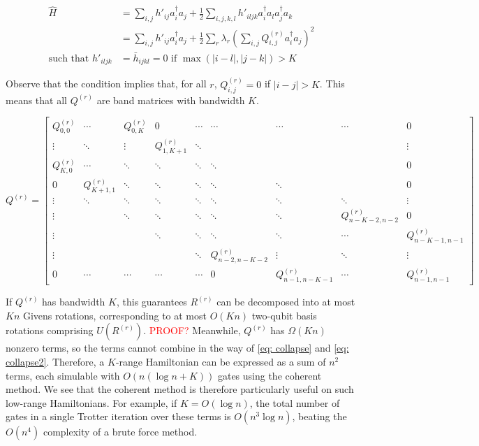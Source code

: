 \begin{equation}
    \begin{split}
        \hat{H} &= \sum_{i, j} h'_{ij}a^\dag_ia_j + \frac{1}{2}\sum_{i,j,k,l} h'_{iljk}a^\dag_ia_la^\dag_ja_k \\
        &= \sum_{i, j} h'_{ij}a^\dag_ia_j + \frac{1}{2}\sum_r\lambda_r\left(\sum_{i,j} Q^{(r)}_{i, j}a^\dag_ia_j\right)^2 \\
        \text{such that } h'_{iljk} &= \bar{h}_{ijkl} = 0 \text{ if } \max(|i - l|, |j - k|) > K
    \end{split}
\end{equation}

Observe that the condition implies that, for all $r$, $Q^{(r)}_{i, j} = 0$ if $|i - j| > K$. This means that all $Q^{(r)}$ are band matrices with bandwidth $K$.

\begin{equation}
    Q^{(r)} = \begin{bmatrix}
        Q^{(r)}_{0, 0} & \cdots & Q^{(r)}_{0, K} & 0 & \cdots & \cdots & \cdots & \cdots & 0 \\
        \vdots & \ddots & \vdots & Q^{(r)}_{1, K + 1} & \ddots & & & & \vdots \\
        Q^{(r)}_{K, 0} & \cdots & \ddots & \ddots & \ddots & \ddots & & & 0 \\
        0 & Q^{(r)}_{K + 1, 1} & \ddots & \ddots & \ddots & \ddots & \ddots & & 0 \\
        \vdots & \ddots & \ddots & \ddots & \ddots & \ddots & \ddots & \ddots & \vdots \\
        \vdots & & \ddots & \ddots & \ddots & \ddots & \ddots & Q^{(r)}_{n - K - 2, n - 2} & 0 \\
        \vdots & & & \ddots & \ddots & \ddots & \ddots & \cdots & Q^{(r)}_{n - K - 1, n - 1} \\
        \vdots & & & & \ddots & Q^{(r)}_{n - 2, n - K - 2} & \vdots & \ddots & \vdots \\
        0 & \cdots & \cdots & \cdots & \cdots & 0 & Q^{(r)}_{n - 1, n - K - 1} & \cdots & Q^{(r)}_{n - 1, n - 1}
    \end{bmatrix}
\end{equation}

If $Q^{(r)}$ has bandwidth $K$, this guarantees $R^{(r)}$ can be decomposed into at most $Kn$ Givens rotations, corresponding to at most $O(Kn)$ two-qubit basis rotations comprising $U(R^{(r)})$. \textcolor{red}{PROOF?} Meanwhile, $Q^{(r)}$ has $\Omega(Kn)$ nonzero terms, so the terms cannot combine in the way of \eqref{eq: collapse} and \eqref{eq: collapse2}. Therefore, a $K$-range Hamiltonian can be expressed as a sum of $n^2$ terms, each simulable with $O(n(\log{n} + K))$ gates using the coherent method. We see that the coherent method is therefore particularly useful on such low-range Hamiltonians. For example, if $K = O(\log{n})$, the total number of gates in a single Trotter iteration over these terms is $O(n^3\log{n})$, beating the $O(n^4)$ complexity of a brute force method.

